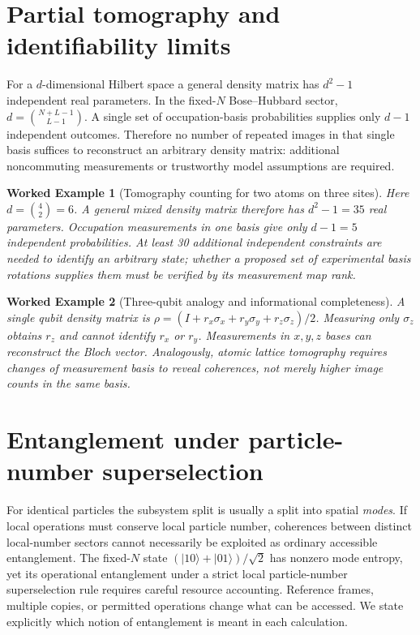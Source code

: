 \documentclass[11pt,a4paper]{article}
\newtheorem{example}{Worked Example}
\begin{document}
\section{Partial tomography and identifiability limits}
For a $d$-dimensional Hilbert space a general density matrix has $d^2-1$ independent real parameters. In the fixed-$N$ Bose--Hubbard sector, $d=\binom{N+L-1}{L-1}$. A single set of occupation-basis probabilities supplies only $d-1$ independent outcomes. Therefore no number of repeated images in that single basis suffices to reconstruct an arbitrary density matrix: additional noncommuting measurements or trustworthy model assumptions are required.
\begin{example}[Tomography counting for two atoms on three sites]
Here $d=\binom{4}{2}=6$. A general mixed density matrix therefore has $d^2-1=35$ real parameters. Occupation measurements in one basis give only $d-1=5$ independent probabilities. At least 30 additional independent constraints are needed to identify an arbitrary state; whether a proposed set of experimental basis rotations supplies them must be verified by its measurement map rank.
\end{example}
\begin{example}[Three-qubit analogy and informational completeness]
A single qubit density matrix is $\rho=(I+r_x\sigma_x+r_y\sigma_y+r_z\sigma_z)/2$. Measuring only $\sigma_z$ obtains $r_z$ and cannot identify $r_x$ or $r_y$. Measurements in $x,y,z$ bases can reconstruct the Bloch vector. Analogously, atomic lattice tomography requires changes of measurement basis to reveal coherences, not merely higher image counts in the same basis.
\end{example}
\section{Entanglement under particle-number superselection}
For identical particles the subsystem split is usually a split into spatial \emph{modes}. If local operations must conserve local particle number, coherences between distinct local-number sectors cannot necessarily be exploited as ordinary accessible entanglement. The fixed-$N$ state $(|10\rangle+|01\rangle)/\sqrt2$ has nonzero mode entropy, yet its operational entanglement under a strict local particle-number superselection rule requires careful resource accounting. Reference frames, multiple copies, or permitted operations change what can be accessed. We state explicitly which notion of entanglement is meant in each calculation.
\end{document}
